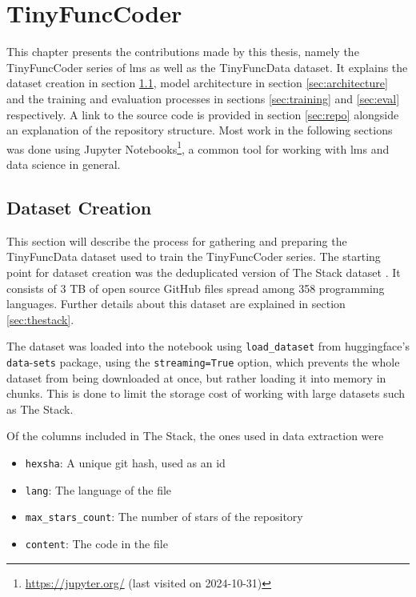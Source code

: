 \chapter{TinyFuncCoder}
\label{chap:tinycoder}
This chapter presents the contributions made by this thesis, namely the TinyFuncCoder series of \acp{lm} as well as the TinyFuncData dataset.
It explains the dataset creation in section \ref{sec:data}, model architecture in section \ref{sec:architecture} and the training and evaluation processes in sections \ref{sec:training} and \ref{sec:eval} respectively.
A link to the source code is provided in section \ref{sec:repo} alongside an explanation of the repository structure.
Most work in the following sections was done using Jupyter Notebooks\footnote{\url{https://jupyter.org/} (last visited on 2024-10-31)}, a common tool for working with \acp{lm} and data science in general.

\section{Dataset Creation}
\label{sec:data}

This section will describe the process for gathering and preparing the TinyFuncData dataset used to train the TinyFuncCoder series.
The starting point for dataset creation was the deduplicated version of The Stack dataset \cite{Kocetkov.2023}.
It consists of 3 TB of open source GitHub files spread among 358 programming languages.
Further details about this dataset are explained in section \ref{sec:thestack}.

The dataset was loaded into the notebook using \texttt{load\_dataset} from huggingface's \texttt{data}-\texttt{sets} package, using the \texttt{streaming=True} option, which prevents the whole dataset from being downloaded at once, but rather loading it into memory in chunks.
This is done to limit the storage cost of working with large datasets such as The Stack.

Of the columns included in The Stack, the ones used in data extraction were
\begin{itemize}
    \item \texttt{hexsha}: A unique git hash, used as an id
    \item \texttt{lang}: The language of the file
    \item \texttt{max\_stars\_count}: The number of stars of the repository
    \item \texttt{content}: The code in the file
\end{itemize}

